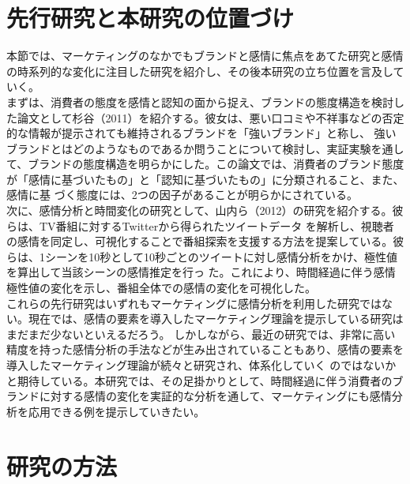 \documentclass[uplatex,11pt]{jsarticle}
\begin{document}
\section{先行研究と本研究の位置づけ}
本節では、マーケティングのなかでもブランドと感情に焦点をあてた研究と感情の時系列的な変化に注目した研究を紹介し、その後本研究の立ち位置を言及していく。\\
まずは、消費者の態度を感情と認知の面から捉え、ブランドの態度構造を検討した論文として杉谷（2011）\cite{杉谷}を紹介する。彼女は、悪い口コミや不祥事などの否定的な情報が提示されても維持されるブランドを「強いブランド」と称し、
強いブランドとはどのようなものであるか問うことについて検討し、実証実験を通して、ブランドの態度構造を明らかにした。この論文では、消費者のブランド態度が「感情に基づいたもの」と「認知に基づいたもの」に分類されること、また、感情に基
づく態度には、2つの因子があることが明らかにされている。\\
次に、感情分析と時間変化の研究として、山内ら（2012）\cite{山内ら}の研究を紹介する。彼らは、TV番組に対するTwitterから得られたツイートデータ
を解析し、視聴者の感情を同定し、可視化することで番組探索を支援する方法を提案している。彼らは、1シーンを10秒として10秒ごとのツイートに対し感情分析をかけ、極性値を算出して当該シーンの感情推定を行っ
た。これにより、時間経過に伴う感情極性値の変化を示し、番組全体での感情の変化を可視化した。\\
これらの先行研究はいずれもマーケティングに感情分析を利用した研究ではない。現在では、感情の要素を導入したマーケティング理論を提示している研究はまだまだ少ないといえるだろう。
しかしながら、最近の研究では、非常に高い精度を持った感情分析の手法などが生み出されていることもあり、感情の要素を導入したマーケティング理論が続々と研究され、体系化していく
のではないかと期待している。本研究では、その足掛かりとして、時間経過に伴う消費者のブランドに対する感情の変化を実証的な分析を通して、マーケティングにも感情分析を応用できる例を提示していきたい。

\section{研究の方法}
\end{document}
